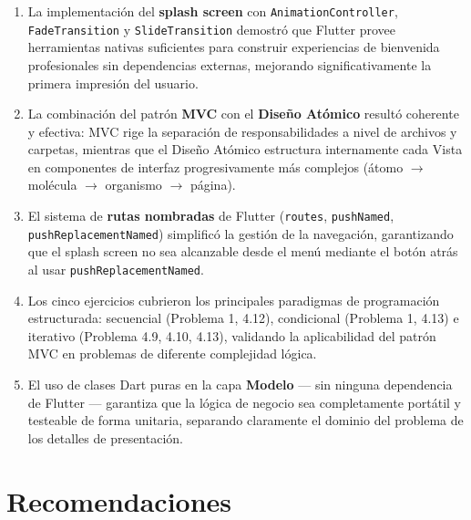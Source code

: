 \documentclass[12pt,a4paper]{article}
\begin{document}
\begin{enumerate}
  \item \begin{sloppypar}La implementación del \textbf{splash screen} con \texttt{Animation\allowbreak{}Controller},\allowbreak{} \texttt{FadeTransition} y \texttt{SlideTransition} demostró que Flutter provee herramientas nativas suficientes para construir experiencias de bienvenida profesionales sin dependencias externas, mejorando significativamente la primera impresión del usuario.\end{sloppypar}

  \item La combinación del patrón \textbf{MVC} con el \textbf{Diseño Atómico} resultó coherente y efectiva: MVC rige la separación de responsabilidades a nivel de archivos y carpetas, mientras que el Diseño Atómico estructura internamente cada Vista en componentes de interfaz progresivamente más complejos (átomo $\rightarrow$ molécula $\rightarrow$ organismo $\rightarrow$ página).

  \item \begin{sloppypar}El sistema de \textbf{rutas nombradas} de Flutter (\texttt{routes},\allowbreak{} \texttt{pushNamed},\allowbreak{} \texttt{push\allowbreak{}ReplacementNamed}) simplificó la gestión de la navegación, garantizando que el splash screen no sea alcanzable desde el menú mediante el botón atrás\allowbreak{} al usar \texttt{push\allowbreak{}ReplacementNamed}.\end{sloppypar}

  \item Los cinco ejercicios cubrieron los principales paradigmas de programación estructurada: secuencial (Problema 1, 4.12), condicional (Problema 1, 4.13) e iterativo (Problema 4.9, 4.10, 4.13), validando la aplicabilidad del patrón MVC en problemas de diferente complejidad lógica.

  \item El uso de clases Dart puras en la capa \textbf{Modelo} --- sin ninguna dependencia de Flutter --- garantiza que la lógica de negocio sea completamente portátil y testeable de forma unitaria, separando claramente el dominio del problema de los detalles de presentación.
\end{enumerate}

\newpage
\section{Recomendaciones}
\end{document}
